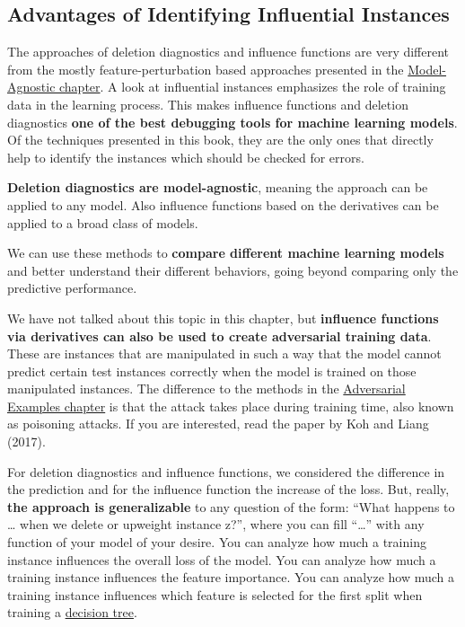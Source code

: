 \documentclass[
  12pt,
]{krantz}
\begin{document}
\hypertarget{advantages-of-identifying-influential-instances}{%
\subsection{Advantages of Identifying Influential Instances}\label{advantages-of-identifying-influential-instances}}

The approaches of deletion diagnostics and influence functions are very different from the mostly feature-perturbation based approaches presented in the \protect\hyperlink{agnostic}{Model-Agnostic chapter}.
A look at influential instances emphasizes the role of training data in the learning process.
This makes influence functions and deletion diagnostics \textbf{one of the best debugging tools for machine learning models}.
Of the techniques presented in this book, they are the only ones that directly help to identify the instances which should be checked for errors.

\textbf{Deletion diagnostics are model-agnostic}, meaning the approach can be applied to any model.
Also influence functions based on the derivatives can be applied to a broad class of models.

We can use these methods to \textbf{compare different machine learning models} and better understand their different behaviors, going beyond comparing only the predictive performance.

We have not talked about this topic in this chapter, but \textbf{influence functions via derivatives can also be used to create adversarial training data}.
These are instances that are manipulated in such a way that the model cannot predict certain test instances correctly when the model is trained on those manipulated instances.
The difference to the methods in the \protect\hyperlink{adversarial}{Adversarial Examples chapter} is that the attack takes place during training time, also known as poisoning attacks.
If you are interested, read the paper by Koh and Liang (2017).

For deletion diagnostics and influence functions, we considered the difference in the prediction and for the influence function the increase of the loss.
But, really, \textbf{the approach is generalizable} to any question of the form:
``What happens to \ldots{} when we delete or upweight instance z?'', where you can fill ``\ldots{}'' with any function of your model of your desire.
You can analyze how much a training instance influences the overall loss of the model.
You can analyze how much a training instance influences the feature importance.
You can analyze how much a training instance influences which feature is selected for the first split when training a \protect\hyperlink{tree}{decision tree}.
\end{document}
